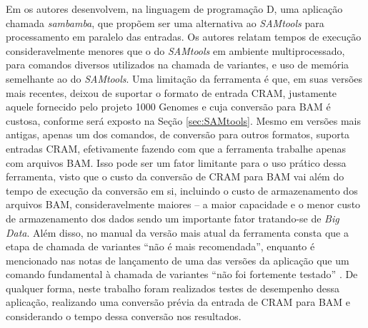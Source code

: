 \documentclass[cic,tc]{iiufrgs}
\begin{document}
Em \cite{tarasov2015sambamba} os autores desenvolvem, na linguagem de
programação D, uma aplicação chamada \textit{sambamba}, que propõem ser uma alternativa
ao \textit{SAMtools} para processamento em paralelo das entradas. Os autores
relatam tempos de execução consideravelmente menores que o do \textit{SAMtools} em
ambiente multiprocessado, para comandos diversos utilizados na chamada de
variantes, e uso de memória semelhante ao do \textit{SAMtools}. Uma limitação da
ferramenta é que, em suas versões mais recentes, deixou de suportar o formato
de entrada CRAM, justamente aquele fornecido pelo projeto 1000 Genomes e cuja
conversão para BAM é custosa, conforme será exposto na Seção
\ref{sec:SAMtools}. Mesmo em versões mais antigas, apenas um dos comandos, de
conversão para outros formatos, suporta entradas CRAM, efetivamente fazendo com
que a ferramenta trabalhe apenas com arquivos BAM. Isso pode ser um fator
limitante para o uso prático dessa ferramenta, visto que o custo da conversão
de CRAM para BAM vai além do tempo de execução da conversão em si, incluindo o
custo de armazenamento dos arquivos BAM, consideravelmente maiores -- a maior
capacidade e o menor custo de armazenamento dos dados sendo um importante fator
tratando-se de \textit{Big Data}. Além disso, no manual da versão mais atual da
ferramenta consta que a etapa de chamada de variantes ``não é mais
recomendada'', enquanto é mencionado nas notas de lançamento de uma das versões
da aplicação que um comando fundamental à chamada de variantes ``não foi
fortemente testado'' \cite{manual2015sambamba}. De qualquer forma, neste
trabalho foram realizados testes de desempenho dessa aplicação, realizando uma
conversão prévia da entrada de CRAM para BAM e considerando o tempo dessa
conversão nos resultados.
\end{document}
